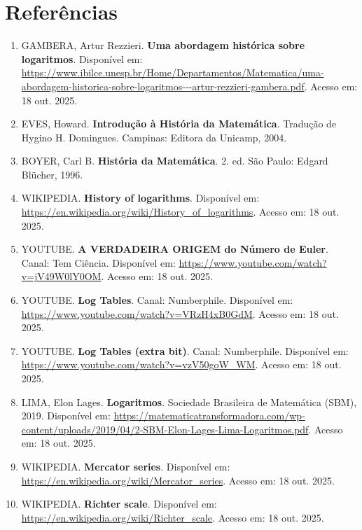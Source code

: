 \section*{Referências}

\begin{enumerate}
    \item GAMBERA, Artur Rezzieri. \textbf{Uma abordagem histórica sobre logaritmos}. Disponível em: \url{https://www.ibilce.unesp.br/Home/Departamentos/Matematica/uma-abordagem-historica-sobre-logaritmos---artur-rezzieri-gambera.pdf}. Acesso em: 18 out. 2025.

    \item EVES, Howard. \textbf{Introdução à História da Matemática}. Tradução de Hygino H. Domingues. Campinas: Editora da Unicamp, 2004.

    \item BOYER, Carl B. \textbf{História da Matemática}. 2. ed. São Paulo: Edgard Blücher, 1996.

    \item WIKIPEDIA. \textbf{History of logarithms}. Disponível em: \url{https://en.wikipedia.org/wiki/History_of_logarithms}. Acesso em: 18 out. 2025.


    \item YOUTUBE. \textbf{A VERDADEIRA ORIGEM do Número de Euler}. Canal: Tem Ciência. Disponível em: \url{https://www.youtube.com/watch?v=jV49W0lY0OM}. Acesso em: 18 out. 2025.

    \item YOUTUBE. \textbf{Log Tables}. Canal: Numberphile. Disponível em: \url{https://www.youtube.com/watch?v=VRzH4xB0GdM}. Acesso em: 18 out. 2025.

    \item YOUTUBE. \textbf{Log Tables (extra bit)}. Canal: Numberphile. Disponível em: \url{https://www.youtube.com/watch?v=vzV50goW_WM}. Acesso em: 18 out. 2025.

    \item LIMA, Elon Lages. \textbf{Logaritmos}. Sociedade Brasileira de Matemática (SBM), 2019. Disponível em: \url{https://matematicatransformadora.com/wp-content/uploads/2019/04/2-SBM-Elon-Lages-Lima-Logaritmos.pdf}. Acesso em: 18 out. 2025.

\item WIKIPEDIA. \textbf{Mercator series}. Disponível em: \url{https://en.wikipedia.org/wiki/Mercator_series}. Acesso em: 18 out. 2025.

\item WIKIPEDIA. \textbf{Richter scale}. Disponível em: \url{https://en.wikipedia.org/wiki/Richter_scale}. Acesso em: 18 out. 2025.


\end{enumerate}
